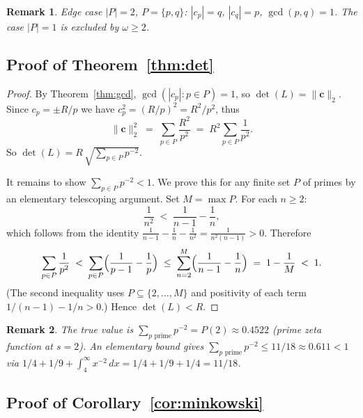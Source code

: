 \documentclass[12pt]{article}
\newtheorem{remark}{Remark}
\theoremstyle{definition}
\begin{document}
\begin{remark}
Edge case $|P|=2$, $P=\{p,q\}$: $|c_p|=q$, $|c_q|=p$, $\gcd(p,q)=1$.
The case $|P|=1$ is excluded by $\omega \ge 2$.
\end{remark}

\subsection{Proof of Theorem~\ref{thm:det}}

\begin{proof}
By Theorem~\ref{thm:gcd}, $\gcd(|c_p|:p\in P)=1$, so $\det(L) = \|\mathbf{c}\|_2$.
Since $c_p = \pm R/p$ we have $c_p^2 = (R/p)^2 = R^2/p^2$, thus
\[
  \|\mathbf{c}\|_2^2
    \;=\; \sum_{p \in P} \frac{R^2}{p^2}
    \;=\; R^2 \sum_{p \in P} \frac{1}{p^2}.
\]
So $\det(L) = R\,\sqrt{\sum_{p \in P} p^{-2}}$.

It remains to show $\sum_{p \in P} p^{-2} < 1$.
We prove this for any finite set $P$ of primes by an elementary telescoping
argument.  Set $M = \max P$.  For each $n \ge 2$:
\[
  \frac{1}{n^2}
  \;<\; \frac{1}{n-1} - \frac{1}{n},
\]
which follows from the identity
$\frac{1}{n-1} - \frac{1}{n} - \frac{1}{n^2} = \frac{1}{n^2(n-1)} > 0$.
Therefore
\[
  \sum_{p \in P} \frac{1}{p^2}
  \;<\; \sum_{p \in P} \Bigl(\frac{1}{p-1} - \frac{1}{p}\Bigr)
  \;\le\; \sum_{n=2}^{M} \Bigl(\frac{1}{n-1} - \frac{1}{n}\Bigr)
  \;=\; 1 - \frac{1}{M}
  \;<\; 1.
\]
(The second inequality uses $P \subseteq \{2,\ldots,M\}$ and positivity of
each term $1/(n-1)-1/n > 0$.)  Hence $\det(L) < R$.
\end{proof}

\begin{remark}
The true value is $\sum_{p \text{ prime}} p^{-2} = P(2) \approx 0.4522$
(prime zeta function at $s=2$).  An elementary bound gives
$\sum_{p \text{ prime}} p^{-2} \le 11/18 \approx 0.611 < 1$
via $1/4 + 1/9 + \int_4^\infty x^{-2}\,dx = 1/4 + 1/9 + 1/4 = 11/18$.
\end{remark}

\subsection{Proof of Corollary~\ref{cor:minkowski}}
\end{document}
